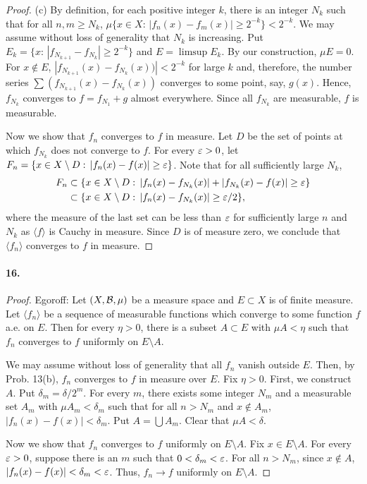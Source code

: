 \begin{proof}
    (c) By definition, for each positive integer $k$, there is an integer $N_k$ 
    such that for all $n,m\ge N_k$, $\mu\{x\in X:\,|f_n(x)-f_m(x)|\ge 2^{-k}\}<
    2^{-k}$. We may assume without loss of generality that $N_k$ is increasing.
    Put $E_k=\{x:\, |f_{N_{k+1}}-f_{N_k}|\ge 2^{-k}\}$ and $E=\limsup E_k$. By
    our construction, $\mu E=0$. For $x\notin E$, $|f_{N_{k+1}}(x)-f_{N_k}(x))|
    <2^{-k}$ for large $k$ and, therefore, the number series $\sum(f_{N_{k+1}}
    (x)-f_{N_k}(x))$ converges to some point, say, $g(x)$. Hence, $f_{N_k}$
    converges to $f=f_{N_1}+g$ almost everywhere. Since all $f_{N_k}$ are
    measurable, $f$ is measurable.\par
    Now we show that $f_n$ converges to $f$ in measure. Let $D$ be the set of
    points at which $f_{N_k}$ does not converge to $f$. For every $\varepsilon>0$,
    let $F_n=\{x\in X\setminus D:\, |f_n(x)-f(x)|\ge\varepsilon\}$. Note that for 
    all sufficiently large $N_k$,
    \begin{align*}
      F_n
      &\subset\{x\in X\setminus D:\,|f_n(x)-f_{N_k}(x)|+|f_{N_k}(x)-f(x)|
      \ge\varepsilon \}\\
      &\subset\{x\in X\setminus D:\,|f_n(x)-f_{N_k}(x)|\ge\varepsilon/2\},
    \end{align*}
    where the measure of the last set can be less than $\varepsilon$ for sufficiently
    large $n$ and $N_k$ as $\langle f\rangle$ is Cauchy in measure. Since $D$
    is of measure zero, we conclude that $\langle f_n\rangle$ converges to $f$
    in measure.
  \end{proof}
  
  
  \paragraph{16.}
  \begin{proof}
    Egoroff: Let $(X,\mathcal{B},\mu)$ be a measure space and $E\subset X$ is of
    finite measure. Let $\langle f_n\rangle$ be a sequence of measurable
    functions which converge to some function $f$ a.e. on $E$. Then
    for every $\eta>0$, there is a subset $A\subset E$ with $\mu A<\eta$ such
    that $f_n$ converges to $f$ uniformly on $E\setminus A$.\par
    We may assume without loss of generality that all $f_n$ vanish outside $E$.
    Then, by Prob. 13(b), $f_n$ converges to $f$ in measure over $E$. Fix 
    $\eta>0$. First, we construct $A$. Put $\delta_m=\delta/2^m$. For every 
    $m$, there exists some integer $N_m$ and a measurable set $A_m$ with $\mu
    A_m<\delta_m$ such that for all $n>N_m$ and $x\notin A_m$, $|f_n(x)-f(x)|<
    \delta_m$. Put $A=\bigcup A_m$. Clear that $\mu A<\delta$.\par
    Now we show that $f_n$ converges to $f$ uniformly on $E\setminus A$. Fix 
    $x\in E\setminus A$. For every $\varepsilon>0$, suppose there is an $m$ such that
    $0<\delta_m<\varepsilon$. For all $n>N_m$, since $x\notin A$, $|f_n(x)-f(x)|<
    \delta_m<\varepsilon$. Thus, $f_n\to f$ uniformly on $E\setminus A$.
  \end{proof}
